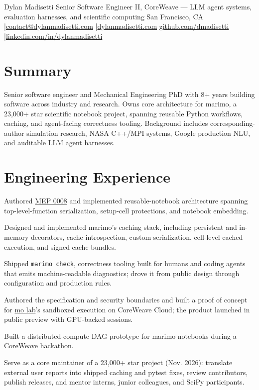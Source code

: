 \documentclass{semantic-resume}
\begin{document}
\resumeheader
  {Dylan Madisetti}
  {Senior Software Engineer II, CoreWeave --- LLM agent systems, evaluation harnesses, and scientific computing}
  {San Francisco, CA \enspace|\enspace \href{mailto:contact@dylanmadisetti.com}{contact@dylanmadisetti.com} \enspace|\enspace \href{https://www.dylanmadisetti.com}{dylanmadisetti.com}}
  {\href{https://github.com/dmadisetti}{github.com/dmadisetti} \enspace|\enspace \href{https://linkedin.com/in/dylanmadisetti}{linkedin.com/in/dylanmadisetti}}

\section{Summary}
Senior software engineer and Mechanical Engineering PhD with 8+ years building
software across industry and research. Owns core architecture for marimo, a
23{,}000+ star scientific notebook project, spanning reusable Python workflows,
caching, and agent-facing correctness tooling. Background includes corresponding-author
simulation research, NASA C++/MPI systems, Google production NLU, and auditable LLM agent harnesses.

\section{Engineering Experience}
\begin{resumeitems}
  \item Authored \href{https://github.com/marimo-team/meps/blob/main/mep-0008.md}{MEP 0008}
    and implemented reusable-notebook architecture spanning top-level-function
    serialization, setup-cell protections, and notebook embedding.
  \item Designed and implemented marimo's caching stack, including persistent and
    in-memory decorators, cache introspection, custom serialization, cell-level
    cached execution, and signed cache bundles.
  \item Shipped \texttt{marimo check}, correctness tooling built for humans and coding
    agents that emits machine-readable diagnostics; drove it from public design
    through configuration and production rules.
  \item Authored the specification and security boundaries and built a proof of
    concept for \href{https://molab.marimo.io}{mo lab}'s sandboxed execution on
    CoreWeave Cloud; the product launched in public preview with GPU-backed sessions.
  \item Built a distributed-compute DAG prototype for marimo notebooks during a
    CoreWeave hackathon.
  \item Serve as a core maintainer of a 23{,}000+ star project (Nov. 2026): translate
    external user reports into shipped caching and pytest fixes, review contributors,
    publish releases, and mentor interns, junior colleagues, and SciPy participants.
\end{resumeitems}
\end{document}
